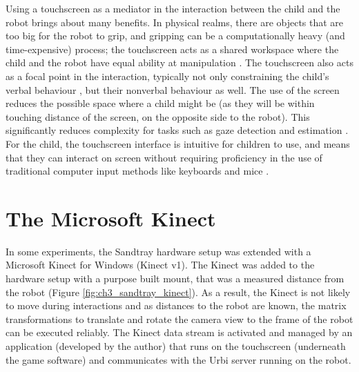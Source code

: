 Using a touchscreen as a mediator in the interaction between the child and the robot brings about many benefits. In physical realms, there are objects that are too big for the robot to grip, and gripping can be a computationally heavy (and time-expensive) process; the touchscreen acts as a shared workspace where the child and the robot have equal ability at manipulation \citep{baxter2012touchscreen}. The touchscreen also acts as a focal point in the interaction, typically not only constraining the child's verbal behaviour \citep{kennedy2013constraining}, but their nonverbal behaviour as well. The use of the screen reduces the possible space where a child might be (as they will be within touching distance of the screen, on the opposite side to the robot). This significantly reduces complexity for tasks such as gaze detection and estimation \citep{lemaignan2016real}. For the child, the touchscreen interface is intuitive for children to use, and means that they can interact on screen without requiring proficiency in the use of traditional computer input methods like keyboards and mice \citep{park2013providing}.

\section{The Microsoft Kinect}\label{sec:method-kinect}
In some experiments, the Sandtray hardware setup was extended with a Microsoft Kinect for Windows (Kinect v1). The Kinect was added to the hardware setup with a purpose built mount, that was a measured distance from the robot (Figure \ref{fig:ch3_sandtray_kinect}). As a result, the Kinect is not likely to move during interactions and as distances to the robot are known, the matrix transformations to translate and rotate the camera view to the frame of the robot can be executed reliably. The Kinect data stream is activated and managed by an application (developed by the author) that runs on the touchscreen (underneath the game software) and communicates with the Urbi server running on the robot.

